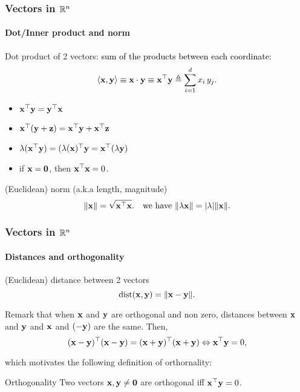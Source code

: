 \begin{frame}
  \frametitle{Vectors in $\mathbb{R}^n$}
  \framesubtitle{Dot/Inner product and norm}

  \begin{block}{Dot product of 2 vectors: \textcolor{black}{sum of the products between each coordinate:}}
  \vspace{-.25cm}
  \begin{equation*}
    \langle \mathbf{x}, \mathbf{y} \rangle \equiv \mathbf{x} \cdot \mathbf{y} \equiv \mathbf{x}^\top \mathbf{y} \triangleq \sum_{i=1}^d x_i \, y_j.
  \end{equation*}
  \begin{multicols}{2}
  \begin{itemize}
    \item $\mathbf{x}^\top \mathbf{y} = \mathbf{y}^\top \mathbf{x}$
    \item $\mathbf{x}^\top (\mathbf{y} + \mathbf{z}) = \mathbf{x}^\top \mathbf{y} + \mathbf{x}^\top \mathbf{z}$
    \item $\lambda (\mathbf{x}^\top \mathbf{y}) = (\lambda (\mathbf{x})^\top \mathbf{y} = \mathbf{x}^\top (\lambda \mathbf{y}) $
    \item if $\mathbf{x} = \boldsymbol 0$, then $\mathbf{x}^\top \mathbf{x} = 0$.
  \end{itemize}
  \end{multicols}
  \end{block}

  \begin{block}{(Euclidean) norm (a.k.a length, magnitude) } 
  \vspace{-.35cm}
    \begin{equation*}
      \| \mathbf{x} \| = \sqrt{\mathbf{x}^\top \mathbf{x}}. \quad \textrm{we have }   \| \lambda \mathbf{x} \| = |\lambda| \| \mathbf{x} \|.
    \end{equation*}
  \end{block}

\end{frame}

\begin{frame}
  \frametitle{Vectors in $\mathbb{R}^n$}
  \framesubtitle{Distances and orthogonality}

  \begin{block}{(Euclidean) distance between 2 vectors} 
    \begin{equation*}
      \text{dist}(\mathbf{x}, \mathbf{y}) = \| \mathbf{x} - \mathbf{y} \|.
    \end{equation*}
  \end{block}

  \pause
  
  Remark that when $\mathbf{x}$ and $\mathbf{y}$ are orthogonal and non zero, distances between $\mathbf{x}$ and $\mathbf{y}$ and $\mathbf{x}$ and $(-\mathbf{y})$ are the same. Then, 
  \begin{equation*}
    (\mathbf{x} - \mathbf{y})^\top(\mathbf{x} - \mathbf{y}) = (\mathbf{x} + \mathbf{y})^\top(\mathbf{x} + \mathbf{y}) \Leftrightarrow \mathbf{x}^\top\mathbf{y}  = 0,
  \end{equation*}
  
  which motivates the following definition of orthornality:
  \begin{block}{Orthogonality}
  Two vectors $\mathbf{x}, \mathbf{y} \neq \boldsymbol 0$ are orthogonal iff $\mathbf{x}^\top \mathbf{y} = 0$.
  \end{block}

\end{frame}


